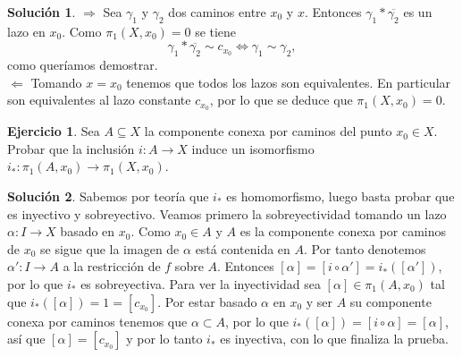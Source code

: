 \documentclass{article}
\theoremstyle{plain}
\theoremstyle{definition}
\newtheorem{exercise}{Ejercicio}
\newtheorem*{sol*}{Solución}
\begin{document}
\begin{sol*}
$\boxed{\Rightarrow}$ Sea $\gamma_1$ y $\gamma_2$ dos caminos entre $x_0$ y $x$. Entonces $\gamma_1*\overline{\gamma_2}$ es un lazo en $x_0$. Como $\pi_1(X,x_0)=0$ se tiene
\[
\gamma_1*\overline{\gamma_2}\sim c_{x_0}\Leftrightarrow \gamma_1\sim\gamma_2,
\]
como queríamos demostrar.\\
$\boxed{\Leftarrow}$ Tomando $x=x_0$ tenemos que todos los lazos son equivalentes. En particular son equivalentes al lazo constante $c_{x_0}$, por lo que se deduce que $\pi_1(X,x_0)=0$.
\end{sol*}


\newpage \begin{exercise} Sea $A\subseteq X$ la componente conexa por caminos del punto $x_0\in X$. Probar que la inclusión
$i: A\to X$ induce un isomorfismo $i_*: \pi_1(A,x_0) \to \pi_1(X,x_0)$.
\end{exercise}
\begin{sol*}
Sabemos por teoría que $i_*$ es homomorfismo, luego basta probar que es inyectivo y sobreyectivo. Veamos primero la sobreyectividad tomando un lazo $\alpha:I\to X$ basado en $x_0$. Como $x_0\in A$ y $A$ es la componente conexa por caminos de $x_0$ se sigue que la imagen de $\alpha$ está contenida en $A$. Por tanto denotemos $\alpha':I\to A$ a la restricción de $f$ sobre $A$. Entonces $[\alpha]=[i\circ \alpha']=i_*([\alpha'])$, por lo que $i_*$ es sobreyectiva. Para ver la inyectividad sea $[\alpha]\in \pi_1(A,x_0)$ tal que $i_*([\alpha])=1=[c_{x_0}]$. Por estar basado $\alpha$ en $x_0$ y ser $A$ su componente conexa por caminos tenemos que $\alpha\subset A$, por lo que $i_*([\alpha])=[i\circ\alpha]=[\alpha]$, así que $[\alpha]=[c_{x_0}]$ y por lo tanto $i_*$ es inyectiva, con lo que finaliza la prueba. 
\end{sol*}

\newpage 
\end{document}

